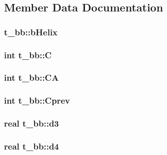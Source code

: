 \subsection{\-Member \-Data \-Documentation}
\hypertarget{structt__bb_a48c50f40d59ad266202feb100567d843}{
\subsubsection[{b\-Helix}]{ {\bf t\-\_\-bb\-::b\-Helix}}}\label{structt__bb_a48c50f40d59ad266202feb100567d843}
\hypertarget{structt__bb_ae25f5c4cb81fcaa339a867a43396545f}{
\subsubsection[{\-C}]{\setlength{\rightskip}{0pt plus 5cm}int {\bf t\-\_\-bb\-::\-C}}}\label{structt__bb_ae25f5c4cb81fcaa339a867a43396545f}
\hypertarget{structt__bb_aabd0ee2d5ea08bc62412d45cdf0f1861}{
\subsubsection[{\-C\-A}]{\setlength{\rightskip}{0pt plus 5cm}int {\bf t\-\_\-bb\-::\-C\-A}}}\label{structt__bb_aabd0ee2d5ea08bc62412d45cdf0f1861}
\hypertarget{structt__bb_a749999610903f9c2549749129930b9bf}{
\subsubsection[{\-Cprev}]{\setlength{\rightskip}{0pt plus 5cm}int {\bf t\-\_\-bb\-::\-Cprev}}}\label{structt__bb_a749999610903f9c2549749129930b9bf}
\hypertarget{structt__bb_a46dd024bb3ba62d1928b9b4031b3644e}{
\subsubsection[{d3}]{\setlength{\rightskip}{0pt plus 5cm}real {\bf t\-\_\-bb\-::d3}}}\label{structt__bb_a46dd024bb3ba62d1928b9b4031b3644e}
\hypertarget{structt__bb_a2572ec60d6d6c28a89e589d067afed16}{
\subsubsection[{d4}]{\setlength{\rightskip}{0pt plus 5cm}real {\bf t\-\_\-bb\-::d4}}}\label{structt__bb_a2572ec60d6d6c28a89e589d067afed16}
